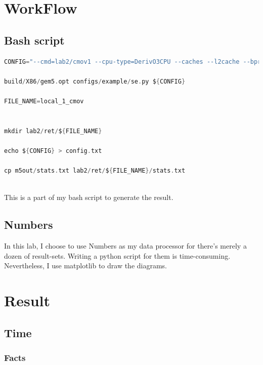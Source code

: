 \documentclass[10pt, a4paper, twocolumn]{article} %
\begin{document}
    \section{WorkFlow}
    \subsection{Bash script}
    \begin{lstlisting}[language=C]
CONFIG="--cmd=lab2/cmov1 --cpu-type=DerivO3CPU --caches --l2cache --bpred=LocalBP"

build/X86/gem5.opt configs/example/se.py ${CONFIG}

FILE_NAME=local_1_cmov


mkdir lab2/ret/${FILE_NAME}

echo ${CONFIG} > config.txt

cp m5out/stats.txt lab2/ret/${FILE_NAME}/stats.txt
        
    \end{lstlisting}
    This is a part of my bash script to generate the result.
    \subsection{Numbers}
    In this lab, I choose to use Numbers as my data processor for there's merely a dozen of result-sets.
    Writing a python script for them is time-consuming. Nevertheless, I use matplotlib to draw the diagrams.
    \section{Result}
    \subsection{Time}
    \subsubsection{Facts}
    
\end{document}
